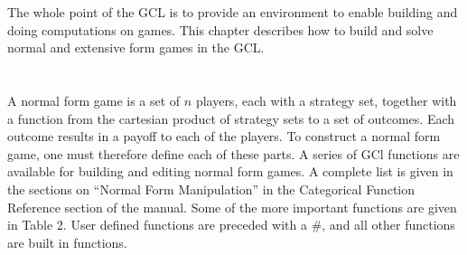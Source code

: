 The whole point of the GCL is to provide an environment to enable
building and doing computations on games.  This chapter describes how
to build and solve normal and extensive form games in the GCL.  

\section{}

A normal form game is a set of $n$ players, each with a strategy
set, together with a function from the cartesian product of strategy
sets to a set of outcomes. Each outcome results in a payoff to each of
the players.  To construct a normal form game, one must therefore
define each of these parts.  A series of GCl functions are available
for building and editing normal form games.  A complete list is given
in the sections on ``Normal Form Manipulation'' in the Categorical
Function Reference section of the manual.  Some of the more important
functions are given in Table 2.  User defined functions are preceded
with a \#, and all other functions are built in functions.  

